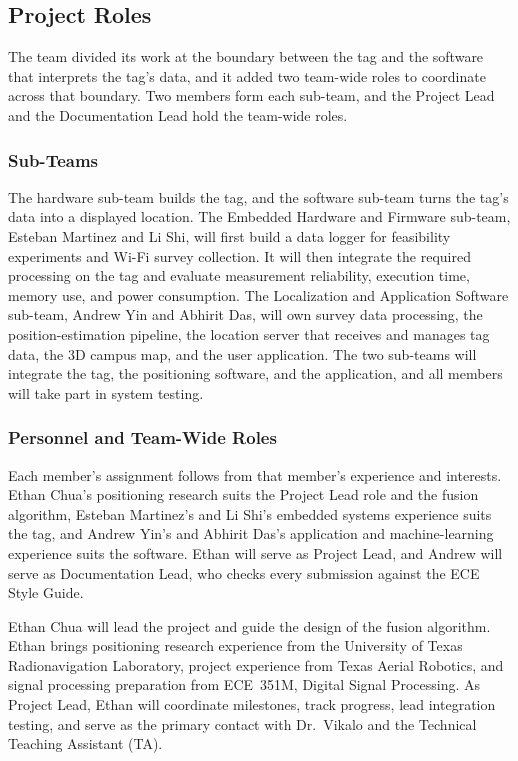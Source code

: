 \documentclass[12pt,letterpaper]{article}
\begin{document}
\subsection{Project Roles}
The team divided its work at the boundary between the tag and the software that interprets the
tag's data, and it added two team-wide roles to coordinate across that boundary. Two members form
each sub-team, and the Project Lead and the Documentation Lead hold the team-wide roles.

\subsubsection{Sub-Teams}
The hardware sub-team builds the tag, and the software sub-team turns the tag's data into a
displayed location. The Embedded Hardware and Firmware sub-team, Esteban Martinez and Li Shi, will
first build a data logger for feasibility experiments and Wi-Fi survey collection. It will then
integrate the required processing on the tag and evaluate measurement reliability, execution time,
memory use, and power consumption. The Localization and Application Software sub-team, Andrew Yin
and Abhirit Das, will own survey data processing, the position-estimation pipeline, the location
server that receives and manages tag data, the 3D campus map, and the user application. The two
sub-teams will integrate the tag, the positioning software, and the application, and all members
will take part in system testing.

\subsubsection{Personnel and Team-Wide Roles}
Each member's assignment follows from that member's experience and interests. Ethan Chua's
positioning research suits the Project Lead role and the fusion algorithm, Esteban Martinez's and Li
Shi's embedded systems experience suits the tag, and Andrew Yin's and Abhirit Das's application and
machine-learning experience suits the software. Ethan will serve as Project Lead, and Andrew will
serve as Documentation Lead, who checks every submission against the ECE Style Guide.

Ethan Chua will lead the project and guide the design of the fusion algorithm. Ethan brings
positioning research experience from the University of Texas Radionavigation Laboratory, project
experience from Texas Aerial Robotics, and signal processing preparation from ECE~351M, Digital
Signal Processing. As Project Lead, Ethan will coordinate milestones, track progress, lead
integration testing, and serve as the primary contact with Dr.\ Vikalo and the Technical Teaching
Assistant (TA).
\end{document}
